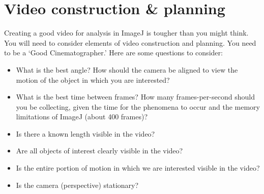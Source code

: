 \section*{Video construction \& planning}
Creating a good video for analysis in ImageJ is tougher than you might think. 
You will need to consider elements of video construction and planning. 
You need to be a ‘Good Cinematographer.’ 
Here are some questions to consider:
\begin{itemize}
\item What is the best angle? How should the camera be aligned to view the motion of the object
in which you are interested?
\item What is the best time between frames? How many frames-per-second should you be collecting, given the time for the phenomena to occur and the memory limitations of ImageJ (about 400 frames)?
\item Is there a known length visible in the video?
\item Are all objects of interest clearly visible in the video?
\item Is the entire portion of motion in which we are interested visible in the video?
\item Is the camera (perspective) stationary?
\end{itemize}

